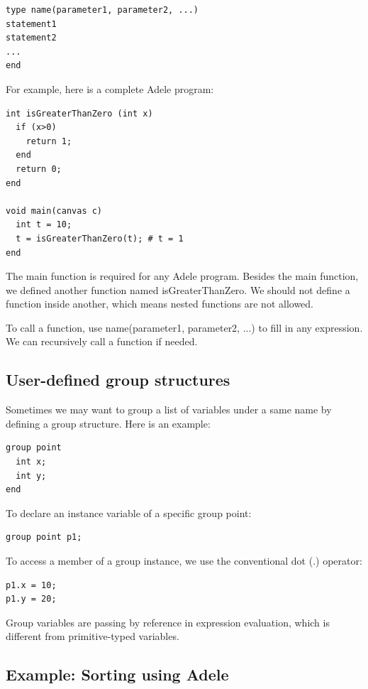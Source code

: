 \documentclass[11pt,letterpaper]{article}
\begin{document}
\begin{lstlisting}
type name(parameter1, parameter2, ...)
statement1
statement2
...
end
\end{lstlisting}

For example, here is a complete Adele program:

\begin{lstlisting}[caption=func.adl, label=func, captionpos=b, tabsize=4, frame=single]
int isGreaterThanZero (int x)
  if (x>0)
    return 1;
  end
  return 0;
end

void main(canvas c)
  int t = 10;
  t = isGreaterThanZero(t); # t = 1
end
\end{lstlisting}

The main function is required for any Adele program. Besides the main function, we defined another function named isGreaterThanZero. We should not define a function inside another, which means nested functions are not allowed.

To call a function, use name(parameter1, parameter2, ...) to fill in any expression. We can recursively call a function if needed.

\subsection {User-defined group structures}
Sometimes we may want to group a list of variables under a same name by defining a group structure. Here is an example:

\begin{lstlisting}
group point
  int x;
  int y;
end
\end{lstlisting}

To declare an instance variable of a specific group point:
\begin{lstlisting}
group point p1;
\end{lstlisting}

To access a member of a group instance, we use the conventional dot (.) operator:
\begin{lstlisting}
p1.x = 10;
p1.y = 20;
\end{lstlisting}

Group variables are passing by reference in expression evaluation, which is different from primitive-typed variables.

\subsection {Example: Sorting using Adele}
\end{document}
